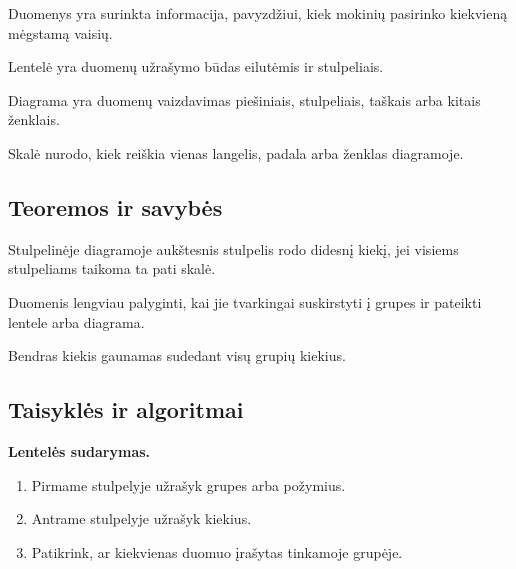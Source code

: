 \begin{apibreztis}
Duomenys yra surinkta informacija, pavyzdžiui, kiek mokinių pasirinko kiekvieną mėgstamą vaisių.
\end{apibreztis}

\begin{apibreztis}
Lentelė yra duomenų užrašymo būdas eilutėmis ir stulpeliais.
\end{apibreztis}

\begin{apibreztis}
Diagrama yra duomenų vaizdavimas piešiniais, stulpeliais, taškais arba kitais ženklais.
\end{apibreztis}

\begin{apibreztis}
Skalė nurodo, kiek reiškia vienas langelis, padala arba ženklas diagramoje.
\end{apibreztis}

\subsection{Teoremos ir savybės}

\begin{savybe}
Stulpelinėje diagramoje aukštesnis stulpelis rodo didesnį kiekį, jei visiems stulpeliams taikoma ta pati skalė.
\end{savybe}

\begin{savybe}
Duomenis lengviau palyginti, kai jie tvarkingai suskirstyti į grupes ir pateikti lentele arba diagrama.
\end{savybe}

\begin{savybe}
Bendras kiekis gaunamas sudedant visų grupių kiekius.
\end{savybe}

\subsection{Taisyklės ir algoritmai}

\textbf{Lentelės sudarymas.}
\begin{enumerate}[label=\arabic*.]
\item Pirmame stulpelyje užrašyk grupes arba požymius.
\item Antrame stulpelyje užrašyk kiekius.
\item Patikrink, ar kiekvienas duomuo įrašytas tinkamoje grupėje.
\end{enumerate}

